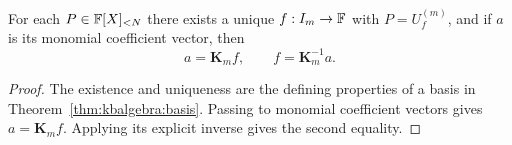 \begin{corollary}\label{cor:kbalgebra:unique-coordinates}
For each $P\in\mathbb{F}[X]_{<N}$ there exists a unique $f:I_m\to\mathbb{F}$ with $P=U_f^{(m)}$, and if $a$ is its monomial coefficient vector, then
\[
 a=\mathbf K_m f,\qquad f=\mathbf K_m^{-1}a.
\]
\end{corollary}
\begin{proof}
The existence and uniqueness are the defining properties of a basis in Theorem~\ref{thm:kbalgebra:basis}. Passing to monomial coefficient vectors gives $a=\mathbf K_m f$. Applying its explicit inverse gives the second equality.
\end{proof}

